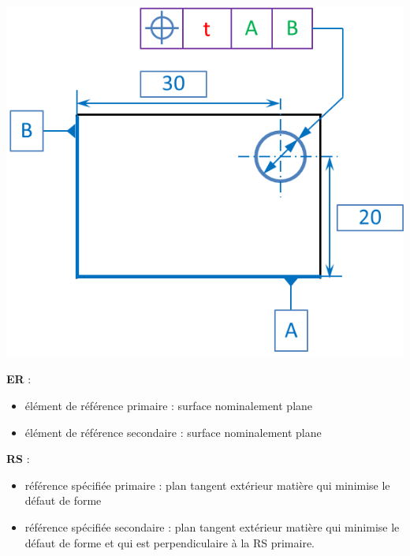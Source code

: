\documentclass[11pt,oneside]{article}
\begin{document}
\begin{exemple}
\begin{minipage}[t]{.3\linewidth}
\begin{center}
$\;$

\includegraphics[width=.95\textwidth]{png/rs_syst}
\end{center}
\end{minipage} \hfill
\begin{minipage}[t]{.3\linewidth}
\textbf{ER} : 
\begin{itemize}
\item élément de référence primaire : surface nominalement plane
\item élément de référence secondaire : surface nominalement plane
\end{itemize}
\textbf{RS} :
\begin{itemize}
\item référence spécifiée primaire : plan tangent extérieur matière qui minimise le défaut de forme
\item référence spécifiée secondaire : plan tangent extérieur matière qui minimise le défaut de forme et qui est perpendiculaire à la RS primaire.
\end{itemize} 
\end{minipage} \hfill
\begin{minipage}[t]{.3\linewidth}
\begin{center}
\end{center}
\end{minipage} 
\end{exemple}
\end{document}

